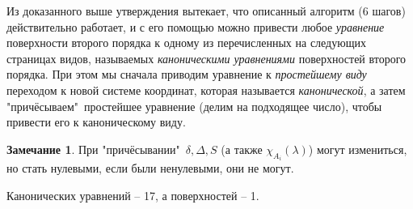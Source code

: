 \documentclass[a4paper, 12pt]{article}
\theoremstyle{definition}
\newtheorem*{remark}{Замечание}
\begin{document}
Из доказанного выше утверждения вытекает, что описанный алгоритм (6 шагов) действительно работает, и с его помощью можно привести любое \textit{уравнение} поверхности второго порядка к одному из перечисленных на следующих страницах видов, называемых \textit{каноническими уравнениями} поверхностей второго порядка.
При этом мы сначала приводим уравнение к \textit{простейшему виду} переходом к новой системе координат, которая называется \textit{канонической}, а затем "причёсываем"\ простейшее уравнение (делим на подходящее число), чтобы привести его к каноническому виду.

\begin{remark}
    При "причёсывании"\ $\delta, \Delta, S$ (а также $\chi_{A_i} (\lambda)$) могут измениться, но стать нулевыми, если были ненулевыми, они не могут.
\end{remark}
Канонических уравнений – 17, а поверхностей – 1. 
\end{document}

